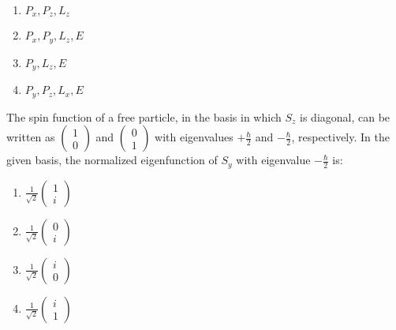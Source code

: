 \begin{multicols}{4}
\begin{enumerate}
\item $P_{x}, P_{z}, L_{z}$
\item $P_{x}, P_{y}, L_{z}, E$
\item $P_{y}, L_{z}, E$
\item $P_{y}, P_{z}, L_{x}, E$
\end{enumerate} 
\end{multicols}
\item The spin function of a free particle, in the basis in which $ S_{z} $ is diagonal, can be written as $ \begin{pmatrix} 1 \\ 0 \end{pmatrix} $ and $ \begin{pmatrix} 0 \\ 1 \end{pmatrix} $ with eigenvalues $ +\frac{\hbar}{2} $ and $ -\frac{\hbar}{2} $, respectively. In the given basis, the normalized eigenfunction of $ S_{y} $ with eigenvalue $ -\frac{\hbar}{2} $ is:
\begin{multicols}{4}
\begin{enumerate}
\item $  \frac{1}{\sqrt{2}}\begin{pmatrix} 1 \\ i \end{pmatrix}$ 
\item $  \frac{1}{\sqrt{2}}\begin{pmatrix} 0 \\ i \end{pmatrix}$ 
\item $  \frac{1}{\sqrt{2}}\begin{pmatrix} i \\ 0 \end{pmatrix} $
\item $  \frac{1}{\sqrt{2}}\begin{pmatrix} i \\ 1 \end{pmatrix}$
\end{enumerate}
\end{multicols}

